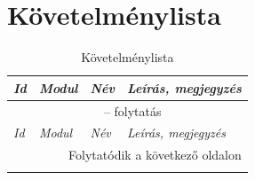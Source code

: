 \documentclass[]{thesis-ekf}
\theoremstyle{definition}
\theoremstyle{remark}
\begin{document}
		\section{Követelménylista}
			\begin{longtable}{|l|l|p{3cm}|p{8cm}|}
				\caption{Követelménylista} \label{kovetelmenylista} \\
				\hline
				\emph{Id} & \emph{Modul} & \emph{Név} & \emph{Leírás, megjegyzés} \\ \hline
				\endfirsthead
				
				\multicolumn{4}{c}{{\tablename\ \thetable{} -- folytatás}} \\
				\hline
				\emph{Id} & \emph{Modul} & \emph{Név} & \emph{Leírás, megjegyzés} \\ \hline
				\endhead
				
				\hline \multicolumn{4}{r}{{Folytatódik a következő oldalon}} \\
				\endfoot
				
				\hline
				\endlastfoot
				

\end{longtable}
\end{document}
